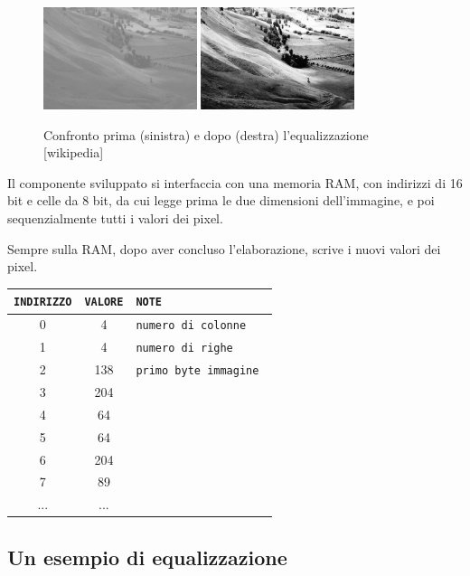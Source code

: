 \documentclass[11pt]{article}
\begin{document}
    \begin{figure}[h]
        \centering
        \includegraphics[width=0.4\textwidth]{before-eq.jpg}
        \qquad
        \includegraphics[width=0.4\textwidth]{after-eq.jpg}
        \caption{Confronto prima (sinistra) e dopo (destra) l'equalizzazione [wikipedia]}
    \end{figure}
    
	Il componente sviluppato si interfaccia con una memoria RAM, con indirizzi di 16 bit e celle da 8 bit, da cui legge prima le due dimensioni dell'immagine, e poi sequenzialmente tutti i valori dei pixel.

	Sempre sulla RAM, dopo aver concluso l'elaborazione, scrive i nuovi valori dei pixel. 

\renewcommand{\arraystretch}{1.2}
\begin{center}
        \begin{tabular}{c|c|l}
		\texttt{INDIRIZZO} & \texttt{VALORE} & \tt NOTE \\
            	\hline
		0 & 4 & \tt numero di colonne \\
		1 & 4 & \tt numero di righe \\
		2 & 138 & \tt primo byte immagine \\
		3 & 204 & \\
		4 & 64 &\\
		5 & 64 &\\
		6 & 204 &\\
		7 & 89 &\\
		... & ... & 
	\end{tabular}
\end{center}
\newpage
\subsection{Un esempio di equalizzazione}
    
\end{document}
